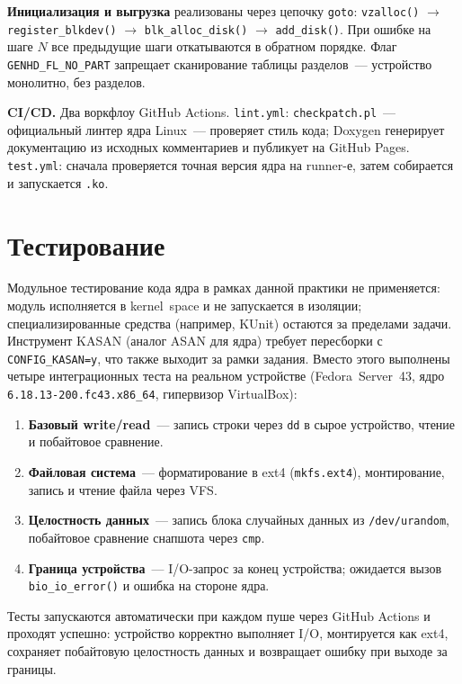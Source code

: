 \documentclass[a4paper]{article}
\begin{document}
\textbf{Инициализация и выгрузка} реализованы через цепочку \texttt{goto}:
\texttt{vzalloc()} $\to$ \texttt{register\_blkdev()} $\to$ \texttt{blk\_alloc\_disk()}
$\to$ \texttt{add\_disk()}. При ошибке на шаге $N$ все предыдущие шаги
откатываются в обратном порядке. Флаг \texttt{GENHD\_FL\_NO\_PART} запрещает
сканирование таблицы разделов~--- устройство монолитно, без разделов.

\textbf{CI/CD.} Два воркфлоу GitHub Actions. \texttt{lint.yml}: \texttt{checkpatch.pl}~---
официальный линтер ядра Linux~--- проверяет стиль кода; Doxygen
генерирует документацию из исходных комментариев и публикует на GitHub Pages.
\texttt{test.yml}: сначала проверяется точная версия ядра на runner-е, затем
собирается и запускается \texttt{.ko}.

\section{Тестирование}

Модульное тестирование кода ядра в рамках данной практики не применяется: модуль исполняется в kernel~space и не запускается в изоляции; специализированные средства (например, KUnit) остаются за пределами задачи. Инструмент KASAN (аналог ASAN для ядра) требует пересборки с \texttt{CONFIG\_KASAN=y}, что также выходит за рамки задания. Вместо этого выполнены четыре интеграционных теста на реальном устройстве (Fedora~Server~43, ядро \texttt{6.18.13-200.fc43.x86\_64}, гипервизор VirtualBox):

\begin{enumerate}
    \item \textbf{Базовый write/read}~--- запись строки через \texttt{dd}
          в сырое устройство, чтение и побайтовое сравнение.
    \item \textbf{Файловая система}~--- форматирование в ext4 (\texttt{mkfs.ext4}),
          монтирование, запись и чтение файла через VFS.
    \item \textbf{Целостность данных}~--- запись блока случайных данных из
          \texttt{/dev/urandom}, побайтовое сравнение снапшота через \texttt{cmp}.
    \item \textbf{Граница устройства}~--- I/O-запрос за конец устройства;
          ожидается вызов \texttt{bio\_io\_error()} и ошибка на стороне ядра.
\end{enumerate}

Тесты запускаются автоматически при каждом пуше через GitHub Actions и проходят
успешно: устройство корректно выполняет I/O, монтируется как ext4, сохраняет
побайтовую целостность данных и возвращает ошибку при выходе за границы.
\end{document}
